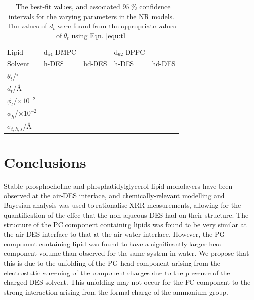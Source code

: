 \documentclass[twoside,twocolumn,9pt]{article}
\begin{document}
\begin{table}
	\small
	\caption{\ The best-fit values, and associated 95 \% confidence intervals for the varying parameters in the NR models. The values of $d_t$ were found from the appropriate values of $\theta_t$ using Eqn. \ref{equ:tl}}
	\label{tab:neutron}
	\begin{tabular*}{0.48\textwidth}{@{\extracolsep{\fill}}lllll}
		\hline
		Lipid & d$_{54}$-DMPC & & d$_{62}$-DPPC & \\
		Solvent & h-DES & hd-DES & h-DES & hd-DES \\
		\hline
		$\theta_t$/$^\circ$ &  &  &  &  \\
		$d_t$/\AA &  &  &  &  \\ 
		$\phi_t$/$\times10^{-2}$ &  &  &  &  \\
		$\phi_h$/$\times10^{-2}$ &  &  &  &  \\
		$\sigma_{t,h,s}$/\AA &  &  &  &  \\
		\hline
	\end{tabular*}
\end{table}

\section{Conclusions}
Stable phosphocholine and phosphatidylglycerol lipid monolayers have been observed at the air-DES interface, and chemically-relevant modelling and Bayesian analysis was used to rationalise XRR measurements, allowing for the quantification of the effec that the non-aqueous DES had on their structure. The structure of the PC component containing lipids was found to be very similar at the air-DES interface to that at the air-water interface. However, the PG component containing lipid was found to have a significantly larger head component volume than observed for the same system in water. We propose that this is due to the unfolding of the PG head component arising from the electrostatic screening of the component charges due to the presence of the charged DES solvent. This unfolding may not occur for the PC component to the strong interaction arising from the formal charge of the ammonium group. 
\end{document}
